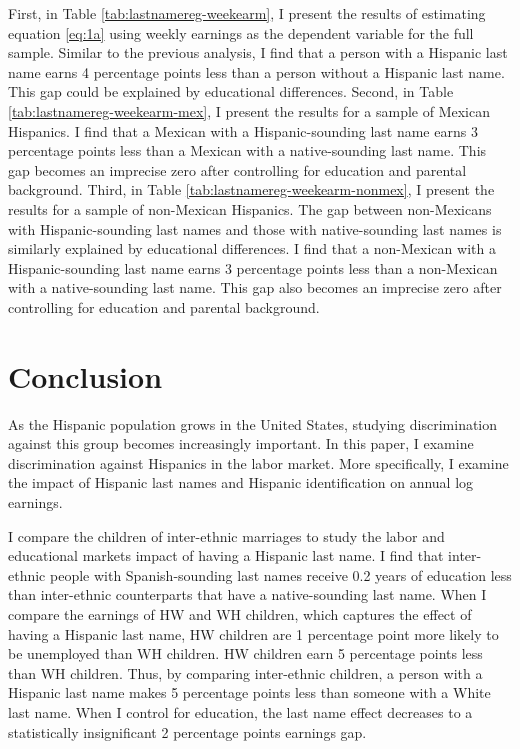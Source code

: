 First, in Table \ref{tab:lastnamereg-weekearm}, I present the results of estimating equation \ref{eq:1a} using weekly earnings as the dependent variable for the full sample. Similar to the previous analysis, I find that a person with a Hispanic last name earns 4 percentage points less than a person without a Hispanic last name. This gap could be explained by educational differences. Second, in Table \ref{tab:lastnamereg-weekearm-mex}, I present the results for a sample of Mexican Hispanics. I find that a Mexican with a Hispanic-sounding last name earns 3 percentage points less than a Mexican with a native-sounding last name. This gap becomes an imprecise zero after controlling for education and parental background. Third, in Table \ref{tab:lastnamereg-weekearm-nonmex}, I present the results for a sample of non-Mexican Hispanics. The gap between non-Mexicans with Hispanic-sounding last names and those with native-sounding last names is similarly explained by educational differences. I find that a non-Mexican with a Hispanic-sounding last name earns 3 percentage points less than a non-Mexican with a native-sounding last name. This gap also becomes an imprecise zero after controlling for education and parental background. 

\section{Conclusion}\label{sec:con1}

As the Hispanic population grows in the United States, studying discrimination against this group becomes increasingly important. In this paper, I examine discrimination against Hispanics in the labor market. More specifically, I examine the impact of Hispanic last names and Hispanic identification on annual log earnings. 

I compare the children of inter-ethnic marriages to study the labor and educational markets impact of having a Hispanic last name. I find that inter-ethnic people with Spanish-sounding last names receive 0.2 years of education less than inter-ethnic counterparts that have a native-sounding last name. When I compare the earnings of HW and WH children, which captures the effect of having a Hispanic last name, HW children are 1 percentage point more likely to be unemployed than WH children. HW children earn 5 percentage points less than WH children. Thus, by comparing inter-ethnic children, a person with a Hispanic last name makes 5 percentage points less than someone with a White last name. When I control for education, the last name effect decreases to a statistically insignificant 2 percentage points earnings gap. 


